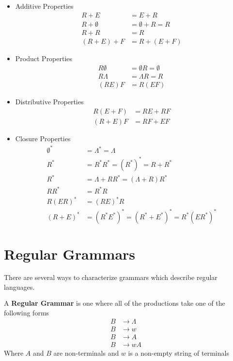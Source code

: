 \begin{itemize}
  \item Additive Properties
  \begin{align*}
    R + E &= E + R\\
    R + \emptyset &= \emptyset + R = R\\
    R + R &= R\\
    (R + E) + F &= R + (E + F)
  \end{align*}
  \item Product Properties
  \begin{align*}
    R \emptyset &= \emptyset R = \emptyset\\
    R \Lambda &= \Lambda R = R\\
    (RE)F &= R(EF)
  \end{align*}
  \item Distributive Properties
  \begin{align*}
    R(E + F) &= RE + RF\\
    (R + E)F &= RF + EF
  \end{align*}
  \item Closure Properties
  \begin{align*}
    \emptyset^* &= \Lambda^* = \Lambda\\
    R^* &= R^*R^* = {(R^*)}^* = R + R^*\\
    R^* &= \Lambda + RR^* = (\Lambda + R)R^*\\
    RR^* &= R^*R\\
    R{(ER)}^* &= {(RE)}^*R\\
    {(R + E)}^* &= {(R^*E^*)}^* = {(R^* + E^*)}^* = R^*{(ER^*)}^*
  \end{align*}
\end{itemize}

\section*{Regular Grammars}

There are several ways to characterize grammars which describe regular languages.

\begin{definition*}{}{}
  A \textbf{Regular Grammar} is one where all of the productions take one of the following forms
  \begin{align*}
    B &\rightarrow \Lambda\\
    B &\rightarrow w\\
    B &\rightarrow A\\
    B &\rightarrow wA
  \end{align*}
  Where $A$ and $B$ are non-terminals and $w$ is a non-empty string of terminals
\end{definition*}

